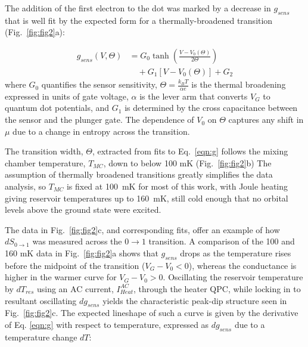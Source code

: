 \documentclass[preprint,showpacs,preprintnumbers,amsmath,amssymb,pra,aps,superscriptaddress]{revtex4-1}
\begin{document}
The addition of the first electron to the dot was marked by a decrease in $g_{sens}$ that is well fit by the expected form for a thermally-broadened transition (Fig.~\ref{fig:fig2}a):

%
\begin{align}
\label{eqn:g}
        g_{sens}(V,\Theta) &= G_0 \tanh\left(\frac{V-V_0(\Theta)}{2\Theta}\right)  \\
                        &\quad + G_1\left[V-V_0(\Theta)\right] + G_2 \nonumber
\end{align}
%
where $G_0$ quantifies the sensor sensitivity, $\Theta = \frac{k_B T}{\alpha e}$ is the thermal broadening expressed in units of gate voltage, $\alpha$ is the lever arm that converts $V_G$ to quantum dot potentials, and $G_1$ is determined by the cross capacitance between the sensor and the plunger gate. The dependence of $V_0$ on $\Theta$ captures any shift in $\mu$ due to a change in entropy across the transition.

The transition width, $\Theta$, extracted from fits to Eq.~\ref{eqn:g} follows the mixing chamber temperature, $T_{MC}$, down to below 100 mK (Fig.~\ref{fig:fig2}b)
The assumption of thermally broadened transitions greatly simplifies the data analysis, so $T_{MC}$ is fixed at \SI{100}{\milli\kelvin} for most of this work, with Joule heating giving reservoir temperatures up to \SI{160}{\milli\kelvin}, still cold enough that no orbital levels above the ground state were excited.

The data in Fig.~\ref{fig:fig2}c, and corresponding fits, offer an example of how $dS_{0\rightarrow 1}$ was measured across the $0 \rightarrow 1$ transition. A comparison of the 100 and 160 mK data in Fig.~\ref{fig:fig2}a shows that $g_{sens}$ drops as the temperature rises before the midpoint of the transition ($V_G-V_0<0$), whereas the conductance is higher in the warmer curve for $V_G-V_0>0$.   Oscillating the reservoir temperature by $dT_{res}$ using an AC current, $I^{AC}_{Heat}$, through the heater QPC, while locking in to resultant oscillating $dg_{sens}$ yields the characteristic peak-dip structure seen in Fig.~\ref{fig:fig2}c.  The expected lineshape of such a curve is given by the derivative of Eq. \ref{eqn:g} with respect to temperature, expressed as $dg_{sens}$ due to a temperature change $dT$:
\end{document}
